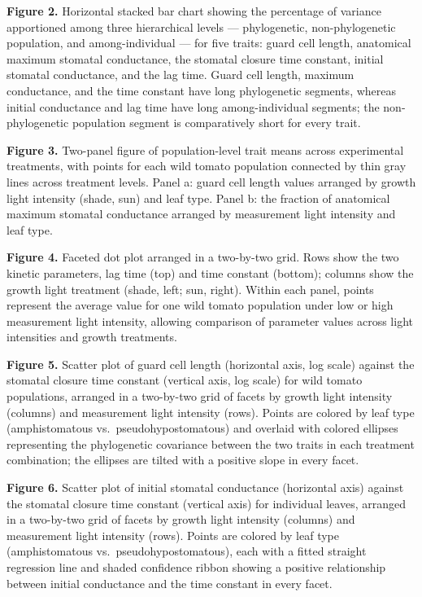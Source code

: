 \documentclass[
  letterpaper,
  DIV=11,
  numbers=noendperiod]{scrartcl}
\begin{document}
\textbf{Figure 2.} Horizontal stacked bar chart showing the percentage
of variance apportioned among three hierarchical levels ---
phylogenetic, non-phylogenetic population, and among-individual --- for
five traits: guard cell length, anatomical maximum stomatal conductance,
the stomatal closure time constant, initial stomatal conductance, and
the lag time. Guard cell length, maximum conductance, and the time
constant have long phylogenetic segments, whereas initial conductance
and lag time have long among-individual segments; the non-phylogenetic
population segment is comparatively short for every trait.

\textbf{Figure 3.} Two-panel figure of population-level trait means
across experimental treatments, with points for each wild tomato
population connected by thin gray lines across treatment levels. Panel
a: guard cell length values arranged by growth light intensity (shade,
sun) and leaf type. Panel b: the fraction of anatomical maximum stomatal
conductance arranged by measurement light intensity and leaf type.

\textbf{Figure 4.} Faceted dot plot arranged in a two-by-two grid. Rows
show the two kinetic parameters, lag time (top) and time constant
(bottom); columns show the growth light treatment (shade, left; sun,
right). Within each panel, points represent the average value for one
wild tomato population under low or high measurement light intensity,
allowing comparison of parameter values across light intensities and
growth treatments.

\textbf{Figure 5.} Scatter plot of guard cell length (horizontal axis,
log scale) against the stomatal closure time constant (vertical axis,
log scale) for wild tomato populations, arranged in a two-by-two grid of
facets by growth light intensity (columns) and measurement light
intensity (rows). Points are colored by leaf type (amphistomatous
vs.~pseudohypostomatous) and overlaid with colored ellipses representing
the phylogenetic covariance between the two traits in each treatment
combination; the ellipses are tilted with a positive slope in every
facet.

\textbf{Figure 6.} Scatter plot of initial stomatal conductance
(horizontal axis) against the stomatal closure time constant (vertical
axis) for individual leaves, arranged in a two-by-two grid of facets by
growth light intensity (columns) and measurement light intensity (rows).
Points are colored by leaf type (amphistomatous
vs.~pseudohypostomatous), each with a fitted straight regression line
and shaded confidence ribbon showing a positive relationship between
initial conductance and the time constant in every facet.
\end{document}
